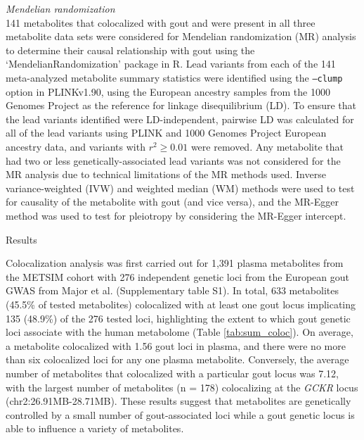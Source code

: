 \documentclass[a4paper,10pt]{article}
\begin{document}
\noindent
\textit{Mendelian randomization}\\
141 metabolites that colocalized with gout and were present in all three metabolite data sets were considered for Mendelian randomization (MR) analysis to determine their causal relationship with gout using the ‘MendelianRandomization’\citep{yavorska_mendelianrandomization_2017} package in R.
Lead variants from each of the 141 meta-analyzed metabolite summary statistics were identified using the \texttt{--clump} option in PLINKv1.90\citep{chang_second-generation_2015}, using the European ancestry samples from the 1000 Genomes Project\citep{auton_global_2015} as the reference for linkage disequilibrium (LD).
To ensure that the lead variants identified were LD-independent, pairwise LD was calculated for all of the lead variants using PLINK and 1000 Genomes Project European ancestry data, and variants with $r^{2} \ge 0.01$ were removed.
Any metabolite that had two or less genetically-associated lead variants was not considered for the MR analysis due to technical limitations of the MR methods used.
Inverse variance-weighted (IVW) and weighted median (WM) methods were used to test for causality of the metabolite with gout (and vice versa), and the MR-Egger method was used to test for pleiotropy by considering the MR-Egger intercept.
\\

\begin{center}
	\large{Results}
\end{center}

\noindent
Colocalization analysis was first carried out for 1,391 plasma metabolites from the METSIM cohort with 276 independent genetic loci from the European gout GWAS from Major et al.\citep{major_genome-wide_2024} (Supplementary table S1).
In total, 633 metabolites (45.5\% of tested metabolites) colocalized with at least one gout locus implicating 135 (48.9\%) of the 276 tested loci, highlighting the extent to which gout genetic loci associate with the human metabolome (Table \ref{tab:sum_coloc}).
On average, a metabolite colocalized with 1.56 gout loci in plasma, and there were no more than six colocalized loci for any one plasma metabolite.
Conversely, the average number of metabolites that colocalized with a particular gout locus was 7.12, with the largest number of metabolites (n = 178) colocalizing at the \textit{GCKR} locus (chr2:26.91MB-28.71MB).
These results suggest that metabolites are genetically controlled by a small number of gout-associated loci while a gout genetic locus is able to influence a variety of metabolites.
\\
\end{document}
